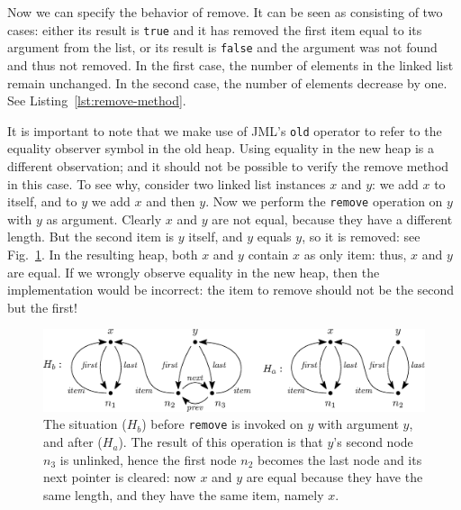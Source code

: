 \documentclass[runningheads]{llncs}
\theoremstyle{remark}
\def\bs{\char092}
\begin{document}
Now we can specify the behavior of remove. It can be seen as consisting of two cases: either its result is \texttt{true} and it has removed the first item equal to its argument from the list, or its result is \texttt{false} and the argument was not found and thus not removed. In the first case, the number of elements in the linked list remain unchanged. In the second case, the number of elements decrease by one. See Listing~\ref{lst:remove-method}.



It is important to note that we make use of JML's \texttt{\bs old} operator to refer to the equality observer symbol in the old heap. Using equality in the new heap is a different observation; and it should not be possible to verify the remove method in this case. To see why, consider two linked list instances $x$ and $y$: we add $x$ to itself, and to $y$ we add $x$ and then $y$. Now we perform the \texttt{remove} operation on $y$ with $y$ as argument. Clearly $x$ and $y$ are not equal, because they have a different length. But the second item is $y$ itself, and $y$ equals $y$, so it is removed: see Fig.~\ref{fig:remove-equals}. In the resulting heap, both $x$ and $y$ contain $x$ as only item: thus, $x$ and $y$ are equal. If we wrongly observe equality in the new heap, then the implementation would be incorrect: the item to remove should not be the second but the first!

\begin{figure}
   \vspace*{-10pt}
   \centering
   \includegraphics[width=\textwidth]{figures/linkedlist-remove-equals.eps}
   \caption{The situation ($H_b$) before \texttt{remove} is invoked on $y$ with argument $y$, and after ($H_a$). The result of this operation is that $y$'s second node $n_3$ is unlinked, hence the first node $n_2$ becomes the last node and its next pointer is cleared: now $x$ and $y$ are equal because they have the same length, and they have the same item, namely $x$.}
   \vspace*{-20pt}
   \label{fig:remove-equals}
\end{figure}
\end{document}
